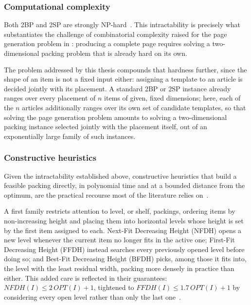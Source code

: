 \subsubsection{Computational complexity}
\label{sec:sota-packing-complexity}

Both 2BP and 2SP are strongly NP-hard~\cite{lodi-packing-survey}. This intractability is precisely what substantiates the challenge of combinatorial complexity raised for the page generation problem in : producing a complete page requires solving a two-dimensional packing problem that is already hard on its own.

The problem addressed by this thesis compounds that hardness further, since the shape of an item is not a fixed input either: assigning a template to an article is decided jointly with its placement. A standard 2BP or 2SP instance already ranges over every placement of $n$ items of given, fixed dimensions; here, each of the $n$ articles additionally ranges over its own set of candidate templates, so that solving the page generation problem amounts to solving a two-dimensional packing instance selected jointly with the placement itself, out of an exponentially large family of such instances.

\subsubsection{Constructive heuristics}
\label{sec:sota-packing-heuristics}

Given the intractability established above, constructive heuristics that build a feasible packing directly, in polynomial time and at a bounded distance from the optimum, are the practical recourse most of the literature relies on~\cite{lodi-packing-survey}. 

A first family restricts attention to level, or shelf, packings, ordering items by non-increasing height and placing them into horizontal levels whose height is set by the first item assigned to each. Next-Fit Decreasing Height (NFDH) opens a new level whenever the current item no longer fits in the active one; First-Fit Decreasing Height (FFDH) instead searches every previously opened level before doing so; and Best-Fit Decreasing Height (BFDH) picks, among those it fits into, the level with the least residual width, packing more densely in practice than either. This added care is reflected in their guarantees: $NFDH(I) \le 2\,OPT(I) + 1$, tightened to $FFDH(I) \le 1.7\,OPT(I) + 1$ by considering every open level rather than only the last one~\cite{lodi-packing-survey}.

